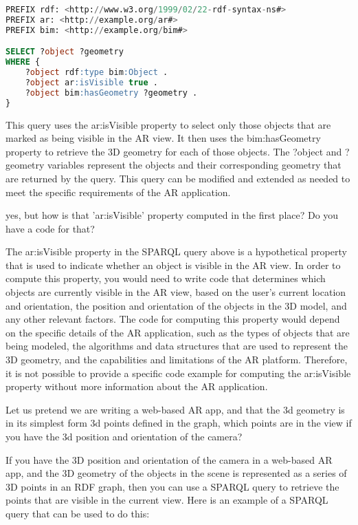 \begin{description}
	\begin{lstlisting}[language=SQL]
PREFIX rdf: <http://www.w3.org/1999/02/22-rdf-syntax-ns#>
PREFIX ar: <http://example.org/ar#>
PREFIX bim: <http://example.org/bim#>

SELECT ?object ?geometry
WHERE {
    ?object rdf:type bim:Object .
    ?object ar:isVisible true .
    ?object bim:hasGeometry ?geometry .
}
\end{lstlisting}

	This query uses the ar:isVisible property to select only those objects that are marked as being visible in the AR view. It then uses the bim:hasGeometry property to retrieve the 3D geometry for each of those objects. The ?object and ?geometry variables represent the objects and their corresponding geometry that are returned by the query. This query can be modified and extended as needed to meet the specific requirements of the AR application.

	\me yes, but how is that 'ar:isVisible' property computed in the first place? Do you have a code for that?

	\gpt The ar:isVisible property in the SPARQL query above is a hypothetical property that is used to indicate whether an object is visible in the AR view. In order to compute this property, you would need to write code that determines which objects are currently visible in the AR view, based on the user's current location and orientation, the position and orientation of the objects in the 3D model, and any other relevant factors. The code for computing this property would depend on the specific details of the AR application, such as the types of objects that are being modeled, the algorithms and data structures that are used to represent the 3D geometry, and the capabilities and limitations of the AR platform. Therefore, it is not possible to provide a specific code example for computing the ar:isVisible property without more information about the AR application.

	\me Let us pretend we are writing a web-based AR app, and that the 3d geometry is in its simplest form 3d points defined in the graph, which points are in the view if you have the 3d position and orientation of the camera?

	\gpt If you have the 3D position and orientation of the camera in a web-based AR app, and the 3D geometry of the objects in the scene is represented as a series of 3D points in an RDF graph, then you can use a SPARQL query to retrieve the points that are visible in the current view. Here is an example of a SPARQL query that can be used to do this:


\end{description}
